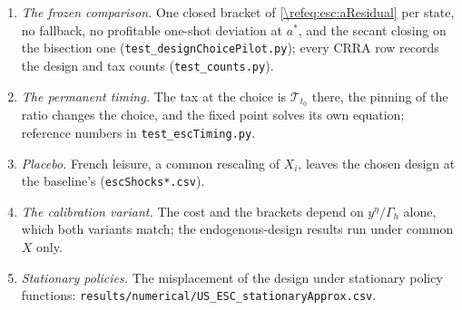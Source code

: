\begin{enumerate}
    \item \emph{The frozen comparison.} One closed bracket of \eqref{\refeq:esc:aResidual} per state, no fallback, no profitable one-shot deviation at $a^{\ast}$, and the secant closing on the bisection one (\texttt{test\_designChoicePilot.py}); every CRRA row records the design and tax counts (\texttt{test\_counts.py}).
    \item \emph{The permanent timing.} The tax at the choice is $\mathcal{T}_{t_0}$ there, the pinning of the ratio changes the choice, and the fixed point solves its own equation; reference numbers in \texttt{test\_escTiming.py}.
    \item \emph{Placebo.} French leisure, a common rescaling of $X_i$, leaves the chosen design at the baseline's (\texttt{escShocks*.csv}).
    \item \emph{The calibration variant.} The cost and the brackets depend on $y^{\eta}/\Gamma_h$ alone, which both variants match; the endogenous-design results run under common $X$ only.
    \item \emph{Stationary policies.} The misplacement of the design under stationary policy functions: \texttt{results/numerical/US\_ESC\_stationaryApprox.csv}.
\end{enumerate}
